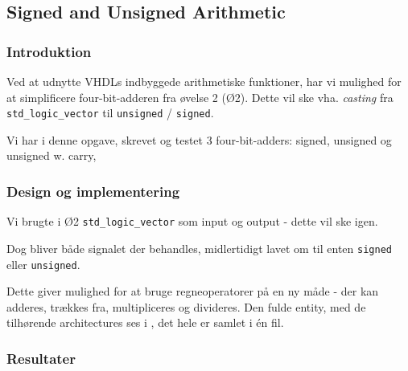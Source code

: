 \subsection{Signed and Unsigned Arithmetic}

\subsubsection{Introduktion}

Ved at udnytte VHDLs indbyggede arithmetiske funktioner, har vi mulighed for at simplificere four-bit-adderen fra øvelse 2 (Ø2).
Dette vil ske vha.  \textit{casting} fra \texttt{std\_logic\_vector} til \texttt{unsigned} / \texttt{signed}. 

Vi har i denne opgave, skrevet og testet 3 four-bit-adders: signed, unsigned og unsigned w. carry, 

\subsubsection{Design og implementering}

Vi brugte i Ø2 \texttt{std\_logic\_vector} som input og output - dette vil ske igen. 

Dog bliver både signalet der behandles, midlertidigt lavet om til enten \texttt{signed} eller \texttt{unsigned}.

Dette giver mulighed for at bruge regneoperatorer på en ny måde - der kan adderes, trækkes fra, multipliceres og divideres. Den fulde entity, med de tilhørende architectures ses i , det hele er samlet i én fil.




\subsubsection{Resultater}



